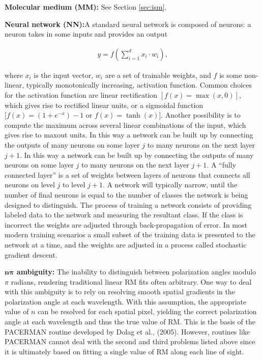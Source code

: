 \documentclass[a4paper,10pt]{article}
\begin{document}
{\noindent}\textbf{Molecular medium (MM):} See Section \ref{sec:ism}. 

{\noindent}\textbf{Neural network (NN):}A standard neural network is composed of neurons: a neuron takes in some inputs and provides an output

\begin{align*}
    y = f \left(\sum_{i=1}^dx_i\cdot w_i\right),
\end{align*}

{\noindent}where $x_i$ is the input vector, $w_i$ are a set of trainable weights, and $f$ is some non-linear, typically monotonically increasing, activation function. Common choices for the activation function are linear rectification $[f(x) = \max (x, 0)]$, which gives rise to rectified linear units, or a sigmoidal function $[f(x) = (1+e^{-x})-1$ or $f(x) = \tanh(x)]$. Another possibility is to compute the maximum across several linear combinations of the input, which gives rise to maxout units. In this way a network can be built up by connecting the outputs of many neurons on some layer $j$ to many neurons on the next layer $j+1$. In this way a network can be built up by connecting the outputs of many neurons on some layer $j$ to many neurons on the next layer $j+1$. A ``fully connected layer'' is a set of weights between layers of neurons that connects all neurons on level $j$ to level $j+1$. A network will typically narrow, until the number of final neurons is equal to the number of classes the network is being designed to distinguish. The process of training a network consists of providing labeled data to the network and measuring the resultant class. If the class is incorrect the weights are adjusted through back-propagation of error. In most modern training scenarios a small subset of the training data is presented to the network at a time, and the weights are adjusted in a process called stochastic gradient descent.

{\noindent}\textbf{$\mathbf{n\pi}$ ambiguity:} The inability to distinguish between polarization angles modulo $\pi$ radians, rendering traditional linear RM fits often arbitrary. One way to deal with this ambiguity is to rely on resolving smooth spatial gradients in the polarization angle at each wavelength. With this assumption, the appropriate value of $n$ can be resolved for each spatial pixel, yielding the correct polarization angle at each wavelength and thus the true value of RM. This is the basis of the PACERMAN routine developed by Dolag et al., (2005). However, routines like PACERMAN cannot deal with the second and third problems listed above since it is ultimately based on fitting a single value of RM along each line of sight. 
\end{document}
